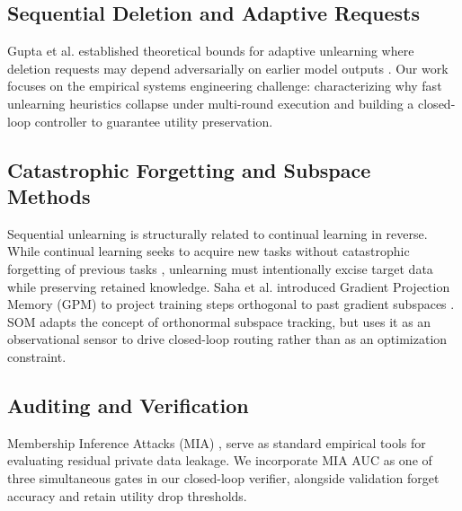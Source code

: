 \documentclass[conference]{IEEEtran}
\begin{document}
\subsection{Sequential Deletion and Adaptive Requests}
Gupta et al. established theoretical bounds for adaptive unlearning where deletion requests may depend adversarially on earlier model outputs \cite{b12}. Our work focuses on the empirical systems engineering challenge: characterizing why fast unlearning heuristics collapse under multi-round execution and building a closed-loop controller to guarantee utility preservation.

\subsection{Catastrophic Forgetting and Subspace Methods}
Sequential unlearning is structurally related to continual learning in reverse. While continual learning seeks to acquire new tasks without catastrophic forgetting of previous tasks \cite{b6}, unlearning must intentionally excise target data while preserving retained knowledge. Saha et al. introduced Gradient Projection Memory (GPM) to project training steps orthogonal to past gradient subspaces \cite{b16}. SOM adapts the concept of orthonormal subspace tracking, but uses it as an observational sensor to drive closed-loop routing rather than as an optimization constraint.

\subsection{Auditing and Verification}
Membership Inference Attacks (MIA) \cite{b9}, \cite{b17} serve as standard empirical tools for evaluating residual private data leakage. We incorporate MIA AUC as one of three simultaneous gates in our closed-loop verifier, alongside validation forget accuracy and retain utility drop thresholds.
\end{document}
